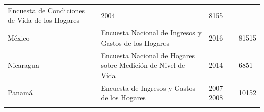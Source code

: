 \documentclass[12pt,spanish,]{book}
\begin{document}
\begin{longtable}[]{@{}llll@{}}
\begin{minipage}[t]{0.50\columnwidth}
Encuesta de Condiciones de Vida de los Hogares\strut
\end{minipage} & \begin{minipage}[t]{0.08\columnwidth}\raggedright
2004\strut
\end{minipage} & \begin{minipage}[t]{0.14\columnwidth}\raggedright
8155\strut
\end{minipage}\tabularnewline
\begin{minipage}[t]{0.17\columnwidth}\raggedright
México\strut
\end{minipage} & \begin{minipage}[t]{0.50\columnwidth}\raggedright
Encuesta Nacional de Ingresos y Gastos de los Hogares\strut
\end{minipage} & \begin{minipage}[t]{0.08\columnwidth}\raggedright
2016\strut
\end{minipage} & \begin{minipage}[t]{0.14\columnwidth}\raggedright
81515\strut
\end{minipage}\tabularnewline
\begin{minipage}[t]{0.17\columnwidth}\raggedright
Nicaragua\strut
\end{minipage} & \begin{minipage}[t]{0.50\columnwidth}\raggedright
Encuesta Nacional de Hogares sobre Medición de Nivel de Vida\strut
\end{minipage} & \begin{minipage}[t]{0.08\columnwidth}\raggedright
2014\strut
\end{minipage} & \begin{minipage}[t]{0.14\columnwidth}\raggedright
6851\strut
\end{minipage}\tabularnewline
\begin{minipage}[t]{0.17\columnwidth}\raggedright
Panamá\strut
\end{minipage} & \begin{minipage}[t]{0.50\columnwidth}\raggedright
Encuesta de Ingresos y Gastos de los Hogares\strut
\end{minipage} & \begin{minipage}[t]{0.08\columnwidth}\raggedright
2007-2008\strut
\end{minipage} & \begin{minipage}[t]{0.14\columnwidth}\raggedright
10152\strut
\end{minipage}\tabularnewline
\begin{minipage}[t]{0.17\columnwidth}\raggedright

\end{minipage}
\end{longtable}
\end{document}
